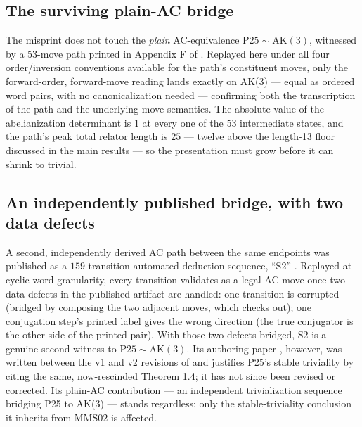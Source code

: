 \subsection{The surviving plain-AC bridge}

The misprint does not touch the \emph{plain} AC-equivalence $\mathrm{P25}\sim\mathrm{AK}(3)$,
witnessed by a 53-move path printed in Appendix F of \cite{shehper2024hard}. Replayed here
under all four order/inversion conventions available for the path's constituent moves, only
the forward-order, forward-move reading lands exactly on AK(3) --- equal as ordered word
pairs, with no canonicalization needed --- confirming both the transcription of the path and
the underlying move semantics. The absolute value of the abelianization determinant is $1$
at every one of the $53$ intermediate states, and the path's peak total relator length is
$25$ --- twelve above the length-13 floor discussed in the main results --- so the presentation
must grow before it can shrink to trivial.

\subsection{An independently published bridge, with two data defects}

A second, independently derived AC path between the same endpoints was published as a
$159$-transition automated-deduction sequence, ``S2'' \cite{lisitsa2025ak3,lisitsa_zenodo}.
Replayed at cyclic-word granularity, every transition validates as a legal AC move once two
data defects in the published artifact are handled: one transition is corrupted (bridged by
composing the two adjacent moves, which checks out); one conjugation step's printed label
gives the wrong direction (the true conjugator is the other side of the printed pair). With
those two defects bridged, S2 is a genuine second witness to
$\mathrm{P25}\sim\mathrm{AK}(3)$. Its authoring paper \cite{lisitsa2025ak3}, however, was
written between the v1 and v2 revisions of \cite{shehper2024hard} and justifies P25's stable
triviality by citing the same, now-rescinded Theorem 1.4; it has not since been revised or
corrected. Its plain-AC contribution --- an independent trivialization sequence bridging P25
to AK(3) --- stands regardless; only the stable-triviality conclusion it inherits from MMS02
is affected.
